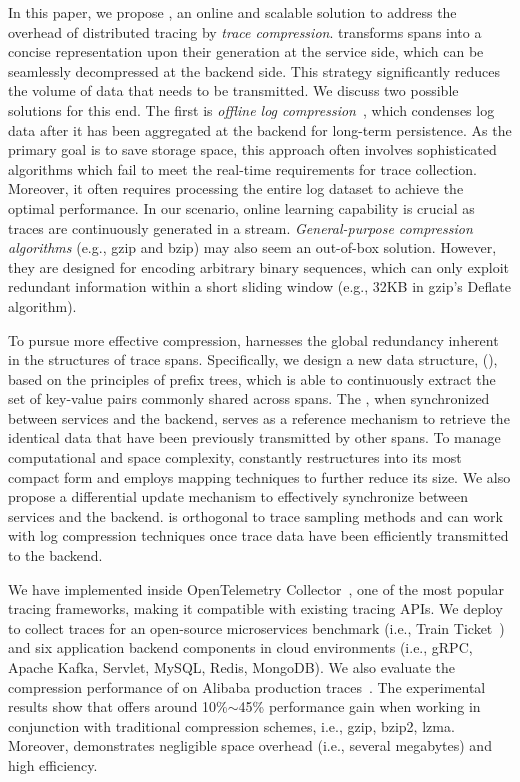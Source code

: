 In this paper, we propose \alias, an online and scalable solution to address the overhead of distributed tracing by \textit{trace compression}.
\alias transforms spans into a concise representation upon their generation at the service side, which can be seamlessly decompressed at the backend side.
This strategy significantly reduces the volume of data that needs to be transmitted.
We discuss two possible solutions for this end.
The first is \textit{offline log compression}~\cite{DBLP:conf/fast/WeiZWLZCSZ21,DBLP:conf/icse/LiZL024,DBLP:conf/osdi/RodriguesLY21,wang2024muslope}, which condenses log data after it has been aggregated at the backend for long-term persistence.
As the primary goal is to save storage space, this approach often involves sophisticated algorithms which fail to meet the real-time requirements for trace collection.
Moreover, it often requires processing the entire log dataset to achieve the optimal performance.
In our scenario, online learning capability is crucial as traces are continuously generated in a stream.
\textit{General-purpose compression algorithms} (e.g., gzip and bzip) may also seem an out-of-box solution.
However, they are designed for encoding arbitrary binary sequences, which can only exploit redundant information within a short sliding window (e.g., 32KB in gzip's Deflate algorithm).

To pursue more effective compression, \alias harnesses the global redundancy inherent in the structures of trace spans. 
Specifically, we design a new data structure, \textit{\name} (\sname), based on the principles of prefix trees, which is able to continuously extract the set of key-value pairs commonly shared across spans.
The \sname, when synchronized between services and the backend, serves as a reference mechanism to retrieve the identical data that have been previously transmitted by other spans.
To manage computational and space complexity, \alias constantly restructures \sname into its most compact form and employs mapping techniques to further reduce its size.
We also propose a differential update mechanism to effectively synchronize \sname between services and the backend.
\alias is orthogonal to trace sampling methods and can work with log compression techniques once trace data have been efficiently transmitted to the backend.

We have implemented \alias inside OpenTelemetry Collector~\cite{opentelemetry_collector}, one of the most popular tracing frameworks, making it compatible with existing tracing APIs.
We deploy \alias to collect traces for an open-source microservices benchmark (i.e., Train Ticket~\cite{DBLP:journals/tse/ZhouPXSJLD21}) and six application backend components in cloud environments (i.e., gRPC, Apache Kafka, Servlet, MySQL, Redis, MongoDB).
We also evaluate the compression performance of \alias on Alibaba production traces~\cite{DBLP:conf/cloud/LuoXLYXZDH021,DBLP:conf/icpp/WangLWJCWDXHYZ22}.
The experimental results show that \alias offers around 10\%$\sim$45\% performance gain when working in conjunction with traditional compression schemes, i.e., gzip, bzip2, lzma.
Moreover, \alias demonstrates negligible space overhead (i.e., several megabytes) and high efficiency.

